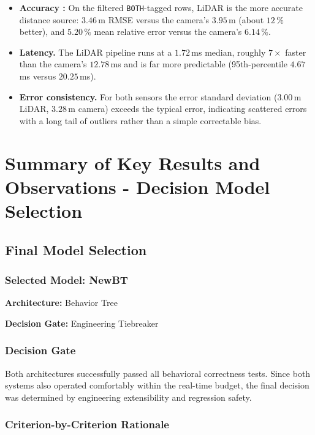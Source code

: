 \documentclass[12pt, a4paper]{report}
\begin{document}
\begin{itemize}
    \item \textbf{Accuracy :} On the filtered \texttt{BOTH}-tagged rows, LiDAR is
    the more accurate distance source: $3.46$\,m RMSE versus the camera's
    $3.95$\,m (about $12\,\%$ better), and $5.20\,\%$ mean relative error versus
    the camera's $6.14\,\%$.
    \item \textbf{Latency.} The LiDAR pipeline runs at a $1.72$\,ms median,
    roughly $7\times$ faster than the camera's $12.78$\,ms and is far more
    predictable (95th-percentile $4.67$\,ms versus $20.25$\,ms).
    \item \textbf{Error consistency.} For both sensors the error standard
    deviation ($3.00$\,m LiDAR, $3.28$\,m camera) exceeds the typical error,
    indicating scattered errors with a long tail of outliers rather than a
    simple correctable bias.

\end{itemize}

\section{Summary of Key Results and Observations - Decision Model Selection }

\subsection{Final Model Selection}

\subsubsection{Selected Model: NewBT}

\textbf{Architecture:} Behavior Tree

\textbf{Decision Gate:} Engineering Tiebreaker

\subsubsection{Decision Gate}

Both architectures successfully passed all behavioral correctness tests. Since both systems also operated comfortably within the real-time budget, the final decision was determined by engineering extensibility and regression safety.

\subsubsection{Criterion-by-Criterion Rationale}
\end{document}
